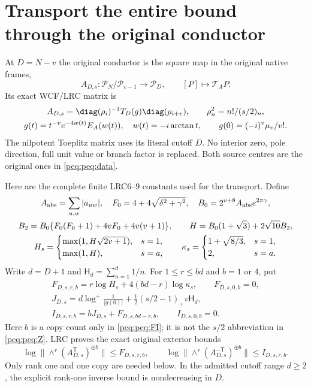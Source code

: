 \documentclass[11pt,a4paper]{article}
\begin{document}
\section{Transport the entire bound through the original conductor}
At $D=N-v$ the original conductor is the square map in the original native frames,
\[
 A_{D,s}:\mathcal P_N/\mathcal P_{v-1}\longrightarrow\mathcal P_D,
 \qquad[P]\longmapsto\mathcal T_AP.
\]
Its exact WCF/LRC matrix is
\begin{equation}
\begin{gathered}
 A_{D,s}=\diag(\rho_i)^{-1}T_D(g)\diag(\rho_{i+v}),\qquad
 \rho_n^2=n!/(s/2)_n,\\
 g(t)=t^{-v}e^{-4w(t)}E_A(w(t)),\quad w(t)=-i\arctan t,\qquad
 g(0)=(-i)^v\mu_v/v!.
\end{gathered}\label{peq:peq:conductor}
\end{equation}
The nilpotent Toeplitz matrix uses its literal cutoff $D$. No interior zero, pole direction, full unit value or branch factor is replaced. Both source centres are the original ones in \eqref{peq:peq:data}.

Here are the complete finite LRC6--9 constants used for the transport. Define
\begin{equation}
\begin{gathered}
 A_{\rm abs}=\sum_{u,w}|a_{uw}|,\quad
 F_0=4+4\sqrt{\delta^2+\gamma^2},\quad
 B_0=2^{v+8}A_{\rm abs}e^{2\pi\gamma},\\
 B_2=B_0\{F_0(F_0+1)+4vF_0+4v(v+1)\},\qquad
 H=B_0(1+\sqrt3)+2\sqrt{10}B_2,\\
 H_s=\begin{cases}\max(1,H\sqrt{2v+1}),&s=1,\\
                 \max(1,H),&s=a,\end{cases}
 \qquad
 \kappa_s=\begin{cases}1+\sqrt{8/3},&s=1,\\2,&s=a.\end{cases}
\end{gathered}\label{peq:peq:H}
\end{equation}
Write $d=D+1$ and $\mathsf H_d=\sum_{n=1}^d1/n$. For $1\le r\le bd$ and $b=1$ or $4$, put
\begin{equation}
\begin{gathered}
 F_{D,s,r,b}=r\log H_s+4(bd-r)\log\kappa_s,\qquad F_{D,s,0,b}=0,\\
 J_{D,s}=d\log^+\frac1{|g(0)|}
       +\tfrac12(s/2-1)_+v\mathsf H_d,\\
 I_{D,s,r,b}=bJ_{D,s}+F_{D,s,bd-r,b},\qquad I_{D,s,0,b}=0.
\end{gathered}\label{peq:peq:FI}
\end{equation}
Here $b$ is a copy count only in \eqref{peq:peq:FI}; it is not the $s/2$ abbreviation in \eqref{peq:peq:Z}. LRC proves the exact original exterior bounds
\[
 \log\|\wedge^r(A_{D,s}^{\mathsf T})^{\oplus b}\|\le F_{D,s,r,b},
 \qquad
 \log\|\wedge^r(A_{D,s}^{-\mathsf T})^{\oplus b}\|\le I_{D,s,r,b}.
\]
Only rank one and one copy are needed below. In the admitted cutoff range $d\ge2$, the explicit rank-one inverse bound is nondecreasing in $D$.
\end{document}

